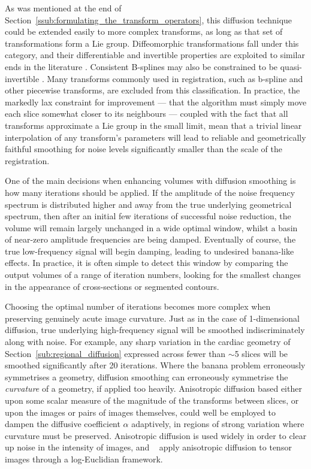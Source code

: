   As was mentioned at the end of Section~\ref{ssub:formulating_the_transform_operators}, this diffusion technique could be extended easily to more complex transforms, as long as that set of transformations form a Lie group. Diffeomorphic transformations fall under this category, and their differentiable and invertible properties are exploited to similar ends in the literature \cite{Avants2006}. Consistent B-splines may also be constrained to be quasi-invertible \cite{Arganda-Carreras2010}. Many transforms commonly used in registration, such as b-spline and other piecewise transforms, are excluded from this classification. In practice, the markedly lax constraint for improvement --- that the algorithm must simply  move each slice somewhat closer to its neighbours --- coupled with the fact that all transforms approximate a Lie group in the small limit, mean that a trivial linear interpolation of any transform's parameters will lead to reliable and geometrically faithful smoothing for noise levels significantly smaller than the scale of the registration.
    
  One of the main decisions when enhancing volumes with diffusion smoothing is how many iterations should be applied. If the amplitude of the noise frequency spectrum is distributed higher and away from the true underlying geometrical spectrum, then after an initial few iterations of successful noise reduction, the volume will remain largely unchanged in a wide optimal window, whilst a basin of near-zero amplitude frequencies are being damped. Eventually of course, the true low-frequency signal will begin damping, leading to undesired banana-like effects. In practice, it is often simple to detect this window by comparing the output volumes of a range of iteration numbers, looking for the smallest changes in the appearance of cross-sections or segmented contours.
  
  Choosing the optimal number of iterations becomes more complex when preserving genuinely acute image curvature. Just as in the case of 1-dimensional diffusion, true underlying high-frequency signal will be smoothed indiscriminately along with noise. For example, any sharp variation in the cardiac geometry of Section~\ref{sub:regional_diffusion} expressed across fewer than $\sim$5 slices will be smoothed significantly after 20 iterations. Where the banana problem erroneously symmetrises a geometry, diffusion smoothing can erroneously symmetrise the \emph{curvature} of a geometry, if applied too heavily. Anisotropic diffusion based either upon some scalar measure of the magnitude of the transforms between slices, or upon the images or pairs of images themselves, could well be employed to dampen the diffusive coefficient $\alpha$ adaptively, in regions of strong variation where curvature must be preserved. Anisotropic diffusion is used widely in order to clear up noise in the intensity of images, and ~\cite{Arsigny2005} apply anisotropic diffusion to tensor images through a log-Euclidian framework.
  
